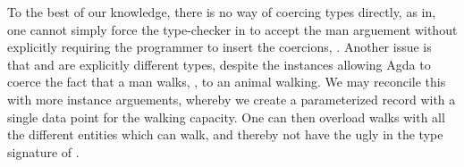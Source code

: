 To the best of our knowledge, there is no way of coercing types directly, as in,
one cannot simply force the type-checker in  to accept the man
arguement without explicitly requiring the programmer to insert the coercions,
. Another issue is that  and  are
explicitly different types, despite the instances allowing Agda to coerce the
fact that a man walks, , to an animal walking. We may
reconcile this with more instance arguements, whereby we create a parameterized
record  with a single data point for the walking capacity. One can
then overload walks with all the different entities which can walk, and thereby
not have the ugly  in the type signature of .

\begin{code}%
\>[0]\AgdaSpace{}%
\AgdaSpace{}%
\AgdaSymbol{\{}\AgdaSymbol{\}}\AgdaSpace{}%
\AgdaSymbol{(}\AgdaSpace{}%
\AgdaSymbol{:}\AgdaSpace{}%
\AgdaSpace{}%
\AgdaSymbol{)}\AgdaSpace{}%
\AgdaSymbol{:}\AgdaSpace{}%
\AgdaSpace{}%
\AgdaSpace{}%
\<%
\\
\>[0][@{}l@{\AgdaIndent{0}}]%
\>[2]\<%
\\
\>[2][@{}l@{\AgdaIndent{0}}]%
\>[4]\AgdaSpace{}%
\AgdaSymbol{:}\AgdaSpace{}%
\AgdaSpace{}%
\AgdaSpace{}%
\<%
\\
%
\\[\AgdaEmptyExtraSkip]%
\>[0]\AgdaSpace{}%
\AgdaSpace{}%
\AgdaSpace{}%
\<%
\\
%
\\[\AgdaEmptyExtraSkip]%
\>[0]\<%
\\
\>[0][@{}l@{\AgdaIndent{0}}]%
\>[2]\AgdaSpace{}%
\AgdaSymbol{:}\AgdaSpace{}%
\AgdaSpace{}%
\<%
\\
%
\\[\AgdaEmptyExtraSkip]%
\>[0]\<%
\\
\>[0][@{}l@{\AgdaIndent{0}}]%
\>[2]\AgdaSpace{}%
\AgdaSymbol{:}\AgdaSpace{}%
\AgdaSpace{}%
\<%
\\
%
\>[2]\AgdaSpace{}%
\AgdaSymbol{=}\AgdaSpace{}%

\end{code}
